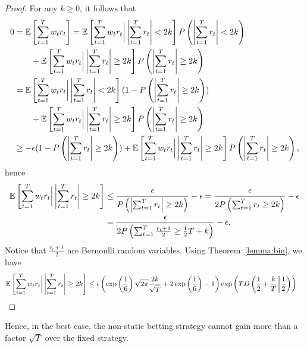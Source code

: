 \begin{proof}
For any $k\geq 0$, it follows that
\begin{align*}
0&=\mathbb{E}\left[\sum_{t=1}^T w_t r_t \right] 
= \mathbb{E}\left[\sum_{t=1}^T w_t r_t \bigg| \left|\sum_{t=1}^T r_t \right|< 2 k\right] P\left(\left|\sum_{t=1}^T r_t\right|< 2k \right)\\
&\qquad+\mathbb{E}\left[\sum_{t=1}^T w_t r_t \bigg| \left|\sum_{t=1}^T r_t \right| \geq 2 k\right] P\left(\left|\sum_{t=1}^T r_t\right|\geq 2 k\right) \\
&=\mathbb{E}\left[\sum_{t=1}^T w_t r_t \bigg| \left|\sum_{t=1}^T r_t \right|< 2 k\right] (1-P\left(\left|\sum_{t=1}^T r_t\right|\geq 2 k\right))\\
&\qquad+\mathbb{E}\left[\sum_{t=1}^T w_t r_t \bigg| \left|\sum_{t=1}^T r_t \right| \geq 2 k\right] P\left(\left|\sum_{t=1}^T r_t\right|\geq 2 k\right) \\
&\geq -\epsilon (1-P\left(\left|\sum_{t=1}^T r_t\right|\geq 2 k\right))+\mathbb{E}\left[\sum_{t=1}^T w_t r_t \bigg| \left|\sum_{t=1}^T r_t\right| \geq 2 k\right] P\left(\left|\sum_{t=1}^T r_t \right|\geq 2 k\right),
\end{align*}
hence
\begin{align*}
\mathbb{E}\left[\sum_{t=1}^T w_t r_t \bigg| \left|\sum_{t=1}^T r_t\right| \geq 2 k\right]
&\leq \frac{\epsilon}{P\left(\left|\sum_{t=1}^T r_t\right|\geq 2 k\right)} -\epsilon
= \frac{\epsilon}{2 P\left(\sum_{t=1}^T r_t \geq 2 k\right)} -\epsilon\\
&= \frac{\epsilon}{2 P\left(\sum_{t=1}^T \frac{r_t + 1}{2} \geq \frac{1}{2}T+ k \right)}-\epsilon.
\end{align*}
Notice that $\frac{r_t + 1}{2}$ are Bernoulli random variables.
Using Theorem~\ref{lemma:bin}, we have
\begin{align*}
\mathbb{E}\left[\sum_{t=1}^T w_t r_t \bigg| \left|\sum_{t=1}^T r_t\right| \geq 2 k\right]
&\leq \epsilon \left(\exp\left(\frac{1}{6}\right)\sqrt{2 \pi}\frac{2k}{\sqrt{T}} +2\exp\left(\frac{1}{6}\right)-1\right)\exp\left(T D\left(\frac{1}{2}+\frac{k}{T}\middle\|\frac{1}{2}\right)\right)
\end{align*}
\end{proof}

Hence, in the best case, the non-static betting strategy cannot gain more than a factor $\sqrt{T}$ over the fixed strategy.